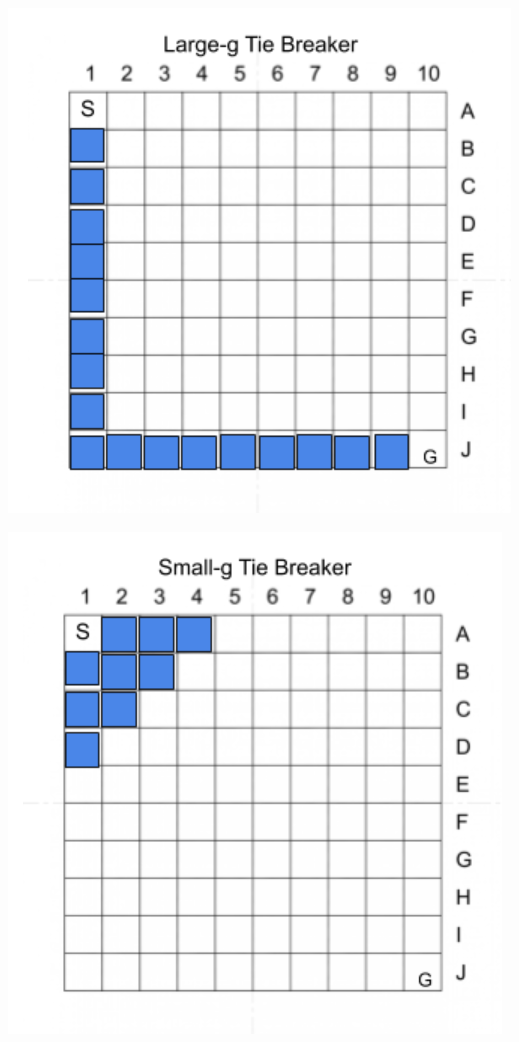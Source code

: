 \documentclass[a4paper]{article}
\theoremstyle{definition}
\theoremstyle{plain}
\begin{document}
\begin{center}
\includegraphics[scale=.6]{part2large.PNG}
\end{center}

\begin{center}
\includegraphics[scale=.6]{part2small.PNG}
\end{center}
\end{document}
